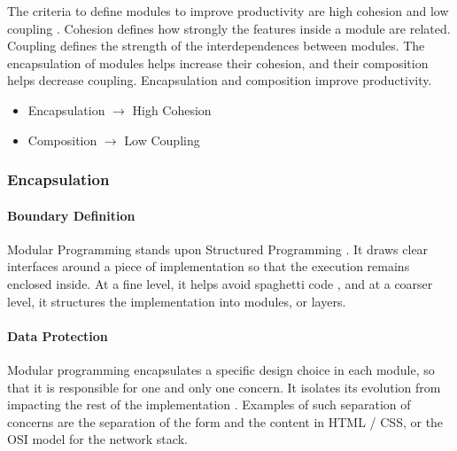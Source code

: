 The criteria to define modules to improve productivity are high cohesion and low coupling \cite{Stevens1974}.
Cohesion defines how strongly the features inside a module are related.
Coupling defines the strength of the interdependences between modules.
The encapsulation of modules helps increase their cohesion, and their composition helps decrease coupling.
Encapsulation and composition improve productivity.

\begin{itemize}
\item Encapsulation $\to$ High Cohesion
\item Composition $\to$ Low Coupling
\end{itemize}

\subsubsection{Encapsulation}

\paragraph{Boundary Definition}
%
Modular Programming stands upon Structured Programming \cite{Dijkstra1970}.
It draws clear interfaces around a piece of implementation so that the execution remains enclosed inside.
At a fine level, it helps avoid spaghetti code \cite{Dijkstra1968a}, and at a coarser level, it structures the implementation \cite{Dijkstra1968} into modules, or layers.

\paragraph{Data Protection}
%
Modular programming encapsulates a specific design choice in each module, so that it is responsible for one and only one concern.
It isolates its evolution from impacting the rest of the implementation \cite{Parnas1972, Tarr1999, Hursch1995}.
Examples of such separation of concerns are the separation of the form and the content in HTML / CSS, or the OSI model for the network stack.

